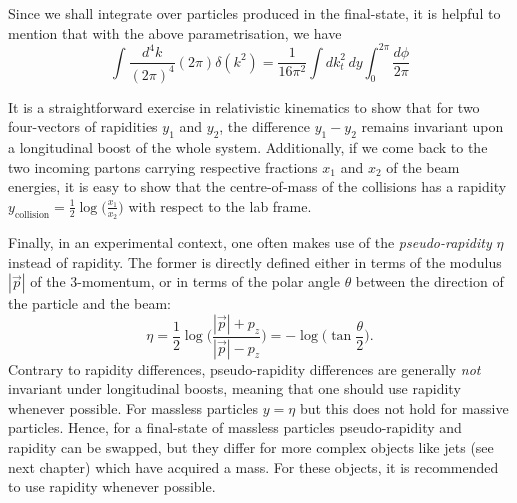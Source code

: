 Since we shall integrate over particles produced in the final-state,
it is helpful to mention that with the above parametrisation, we have
\begin{equation}\label{eq:4vect-phase-space}
  \int \frac{d^4k}{(2\pi)^4}(2\pi)\delta(k^2)
  = \frac{1}{16\pi^2}\int dk_t^2\,dy\int_0^{2\pi}\frac{d\phi}{2\pi} 
\end{equation}

It is a straightforward exercise in relativistic kinematics to show that for two four-vectors of rapidities
$y_1$ and $y_2$, the difference $y_1-y_2$ remains invariant upon a
longitudinal boost of the whole system.
%
Additionally, if we come back to the two incoming partons carrying
respective fractions $x_1$ and $x_2$ of the beam energies, it is easy
to show that the centre-of-mass of the collisions has a rapidity
$y_\text{collision} =  \frac{1}{2}\log\big(\frac{x_1}{x_2}\big)$ with respect to the lab frame.

Finally, in an experimental context, one often makes use of the {\em
  pseudo-rapidity} $\eta$ instead of rapidity. The former is directly
defined either in terms of the modulus $|\vec{p}|$ of the 3-momentum,
or in terms of the polar angle $\theta$ between the direction of the
particle and the beam:
\begin{equation}\label{eq:def-pseudo-rapidity}
\eta = \frac{1}{2}\log\bigg(\frac{|\vec{p}|+p_z}{|\vec{p}|-p_z}\bigg) = -\log\bigg(\tan\frac{\theta}{2}\bigg).
\end{equation}
%
Contrary to rapidity differences, pseudo-rapidity differences are
generally \emph{not} invariant under longitudinal boosts, meaning that one
should use rapidity whenever possible.
%
For massless particles $y=\eta$ but this does not hold for massive
particles. Hence, for a final-state of massless particles
pseudo-rapidity and rapidity can be swapped, but they differ for more
complex objects like jets (see next chapter) which have acquired a
mass.
%
For these objects, it is recommended to use rapidity whenever possible.






